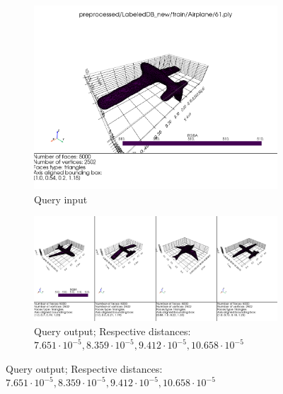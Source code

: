 \begin{figure}[H]
    \centering

    \begin{subfigure}[b]{0.3\textwidth}
        \includegraphics[width=\textwidth]{assets/queries/airplane/input.png}
        \caption{Query input \newline}
        \label{fig:query-input-knn-1}
    \end{subfigure}
    \hfill
    \begin{subfigure}[b]{0.65\textwidth}
        \includegraphics[width=\textwidth]{assets/queries/airplane/output.png}
        \caption{Query output; Respective distances: $7.651\cdot10^{-5}, 8.359\cdot10^{-5}, 9.412\cdot10^{-5}, 10.658\cdot10^{-5}$ }
        \label{fig:query-output-knn-1}
    \end{subfigure}
    \hfill


\end{figure}
